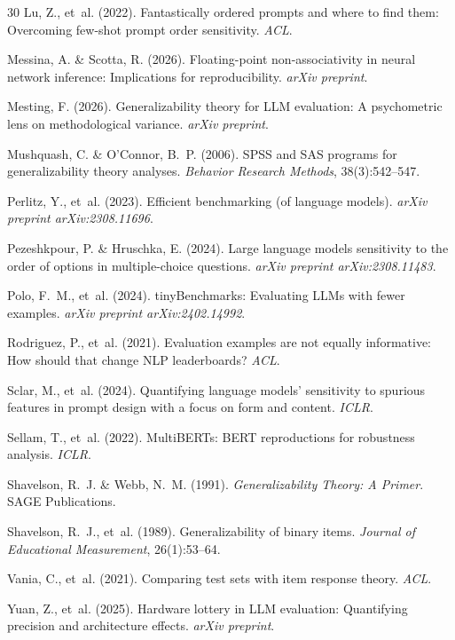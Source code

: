 \documentclass[11pt,a4paper]{article}
\begin{document}
\begin{thebibliography}{30}
Lu, Z., et~al. (2022).
\newblock Fantastically ordered prompts and where to find them: Overcoming few-shot prompt order sensitivity.
\newblock \emph{ACL}.

Messina, A. \& Scotta, R. (2026).
\newblock Floating-point non-associativity in neural network inference: Implications for reproducibility.
\newblock \emph{arXiv preprint}.

Mesting, F. (2026).
\newblock Generalizability theory for LLM evaluation: A psychometric lens on methodological variance.
\newblock \emph{arXiv preprint}.

Mushquash, C. \& O'Connor, B.~P. (2006).
\newblock SPSS and SAS programs for generalizability theory analyses.
\newblock \emph{Behavior Research Methods}, 38(3):542--547.

Perlitz, Y., et~al. (2023).
\newblock Efficient benchmarking (of language models).
\newblock \emph{arXiv preprint arXiv:2308.11696}.

Pezeshkpour, P. \& Hruschka, E. (2024).
\newblock Large language models sensitivity to the order of options in multiple-choice questions.
\newblock \emph{arXiv preprint arXiv:2308.11483}.

Polo, F.~M., et~al. (2024).
\newblock tinyBenchmarks: Evaluating LLMs with fewer examples.
\newblock \emph{arXiv preprint arXiv:2402.14992}.

Rodriguez, P., et~al. (2021).
\newblock Evaluation examples are not equally informative: How should that change NLP leaderboards?
\newblock \emph{ACL}.

Sclar, M., et~al. (2024).
\newblock Quantifying language models' sensitivity to spurious features in prompt design with a focus on form and content.
\newblock \emph{ICLR}.

Sellam, T., et~al. (2022).
\newblock MultiBERTs: BERT reproductions for robustness analysis.
\newblock \emph{ICLR}.

Shavelson, R.~J. \& Webb, N.~M. (1991).
\newblock \emph{Generalizability Theory: A Primer}.
\newblock SAGE Publications.

Shavelson, R.~J., et~al. (1989).
\newblock Generalizability of binary items.
\newblock \emph{Journal of Educational Measurement}, 26(1):53--64.

Vania, C., et~al. (2021).
\newblock Comparing test sets with item response theory.
\newblock \emph{ACL}.

Yuan, Z., et~al. (2025).
\newblock Hardware lottery in LLM evaluation: Quantifying precision and architecture effects.
\newblock \emph{arXiv preprint}.

\end{thebibliography}
\end{document}
